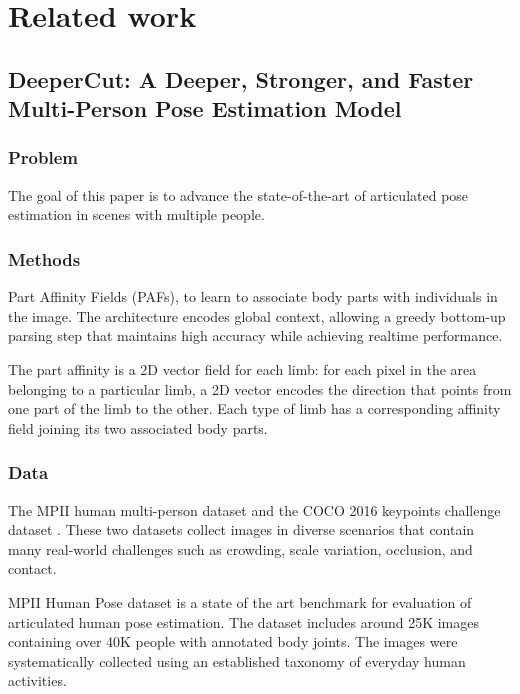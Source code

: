 \documentclass[runningheads,a4paper,11pt]{report}
\begin{document}
\chapter{Related work}

\section{DeeperCut\mbox{:} A Deeper, Stronger, and Faster Multi-Person Pose Estimation Model \cite{DBLP:journals/corr/InsafutdinovPAA16}}

\subsection{Problem}
The goal of this paper is to advance the state-of-the-art of articulated pose estimation in scenes with multiple people.

\subsection{Methods}
\par Part Affinity Fields (PAFs), to learn to associate body parts with individuals in the image. The architecture encodes global context, allowing a greedy bottom-up parsing step that maintains high accuracy while achieving realtime performance.	
\par The part affinity is a 2D vector field for each limb: for each pixel in the area belonging to a particular limb, a 2D vector encodes the direction that points from one part of the limb to the other. Each type of limb has a corresponding affinity field joining its two associated body parts.


\subsection{Data}
\par The MPII human multi-person dataset \cite{database2dhuman}  and the COCO 2016 keypoints challenge dataset \cite{coco2016}. These two datasets collect images in diverse scenarios that contain many real-world challenges such as crowding, scale variation, occlusion, and contact.
\par MPII Human Pose dataset is a state of the art benchmark for evaluation of articulated human pose estimation. The dataset includes around 25K images containing over 40K people with annotated body joints. The images were systematically collected using an established taxonomy of everyday human activities.
\end{document}
